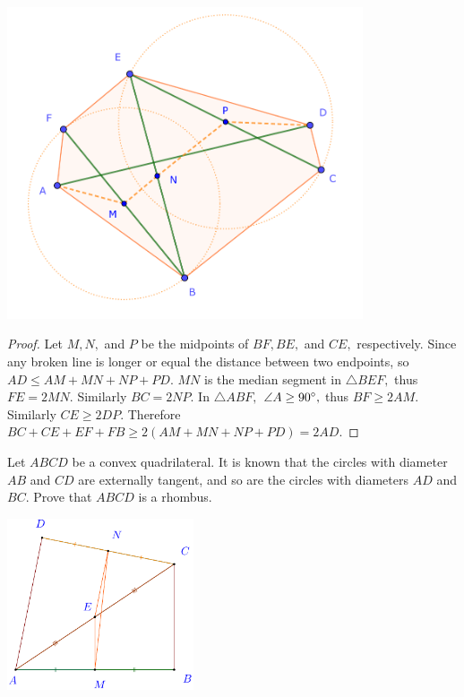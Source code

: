 \documentclass{article}
\begin{document}
\begin{center}
    \includegraphics[width=10.5cm]{./svg/pdf/pi-2023-02-03.pdf}
\end{center}

\begin{proof}
    Let $M, N,$ and $P$ be the midpoints of $BF, BE,$ and $CE,$ respectively.
    Since any broken line is longer or equal the distance between two endpoints, so $AD\le AM+MN+NP+PD.$
    $MN$ is the median segment in $\triangle BEF,$ thus $FE = 2MN.$ Similarly $BC=2NP.$
    In $\triangle ABF,$ $\angle A \ge 90^\circ,$ thus $BF \ge 2AM.$ Similarly $CE \ge 2DP.$
    Therefore $BC+CE+EF+FB \ge 2(AM+MN+NP+PD) = 2AD.$
\end{proof}

\newpage

\begin{example*}
   
    Let $ABCD$ be a convex quadrilateral. It is known that the circles with diameter $AB$ and $CD$ are externally tangent,
    and so are the circles with diameters $AD$ and $BC.$
    Prove that $ABCD$ is a rhombus.
\end{example*}

\begin{center}
    \includegraphics[width=5.5cm]{./asy/pdf/romanian-pb-gt-40.pdf}
\end{center}
\end{document}
